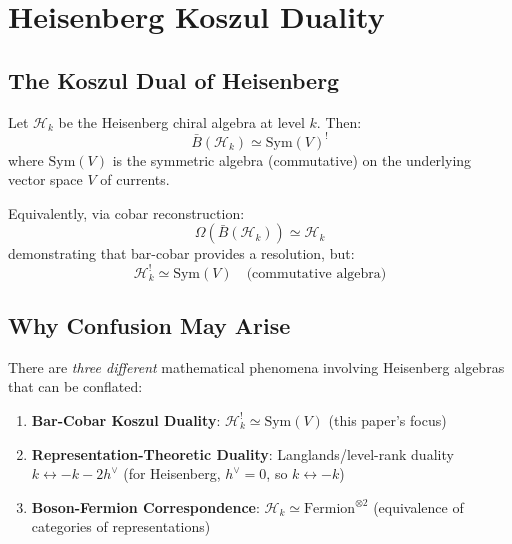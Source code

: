 \section{Heisenberg Koszul Duality}
\label{sec:heisenberg-correction-intro}


\subsection{The Koszul Dual of Heisenberg}

\begin{theorem}
\label{thm:heisenberg-koszul-correct-intro}
Let $\mathcal{H}_k$ be the Heisenberg chiral algebra at level $k$. Then:
\begin{equation}
\bar{B}(\mathcal{H}_k) \simeq \text{Sym}(V)^!
\end{equation}
where $\text{Sym}(V)$ is the symmetric algebra (commutative) on the underlying vector space $V$ of currents.

Equivalently, via cobar reconstruction:
\begin{equation}
\Omega(\bar{B}(\mathcal{H}_k)) \simeq \mathcal{H}_k
\end{equation}
demonstrating that bar-cobar provides a resolution, but:
\begin{equation}
\mathcal{H}_k^! \simeq \text{Sym}(V) \quad \text{(commutative algebra)}
\end{equation}
\end{theorem}

\subsection{Why Confusion May Arise}

There are \emph{three different} mathematical phenomena involving Heisenberg algebras that can be conflated:

\begin{enumerate}
\item \textbf{Bar-Cobar Koszul Duality}: $\mathcal{H}_k^! \simeq \text{Sym}(V)$ (this paper's focus)
\item \textbf{Representation-Theoretic Duality}: Langlands/level-rank duality $k \leftrightarrow -k-2h^\vee$ (for Heisenberg, $h^\vee = 0$, so $k \leftrightarrow -k$)
\item \textbf{Boson-Fermion Correspondence}: $\mathcal{H}_k \simeq \text{Fermion}^{\otimes 2}$ (equivalence of categories of representations)
\end{enumerate}

